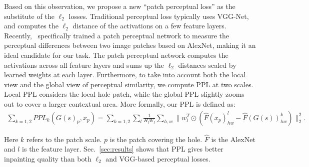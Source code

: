 Based on this observation, we propose a new ``patch perceptual loss'' as the substitute of the $\ell_2$ losses. Traditional perceptual loss typically uses VGG-Net, and computes the $\ell_2$ distance of the activations on a few feature layers. Recently,~\cite{zhang2016stackgan} specifically trained a patch perceptual network to measure the perceptual differences between two image patches based on AlexNet, making it an ideal candidate for our task. The patch perceptual network computes the activations across all feature layers and sums up the $\ell_2$ distances scaled by learned weights at each layer. Furthermore, to take into account both the local view and the global view of perceptual similarity, we compute PPL at two scales. Local PPL considers the local hole patch, while the global PPL slightly zooms out to cover a larger contextual area. More formally, our PPL is defined as:
\begin{eqnarray}
\sum\limits_{k=1,2}PPL_k(G(s)_p, x_p) = \sum\limits_{k=1,2}\sum\limits_l\frac{1}{H_lW_l}\sum\limits_{h,w}\parallel w_l^T\odot(\hat{F}(x_p)^l_{hw}-\hat{F}(G(s))^k_{hw})\parallel^2_2.
\end{eqnarray}

Here $k$ refers to the patch scale. $p$ is the patch covering the hole. $\hat{F}$ is the AlexNet and $l$ is the feature layer. Sec.~\ref{sec:results} shows that PPL gives better inpainting quality than both $\ell_2$ and VGG-based perceptual losses. 

